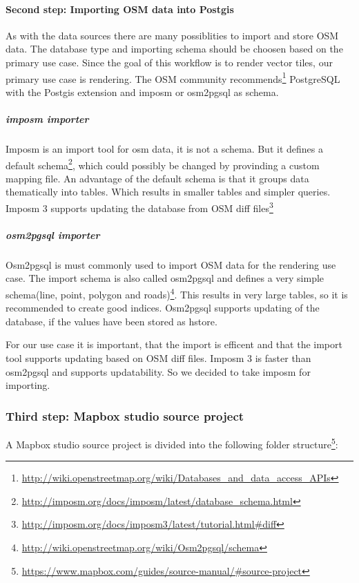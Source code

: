 \paragraph{Second step: Importing OSM data into
Postgis}\label{second-step-importing-osm-data-into-postgis}

As with the data sources there are many possiblities to import and store
OSM data. The database type and importing schema should be choosen based
on the primary use case. Since the goal of this workflow is to render
vector tiles, our primary use case is rendering. The OSM community
recommends\footnote{\url{http://wiki.openstreetmap.org/wiki/Databases_and_data_access_APIs}}
PostgreSQL with the Postgis extension and imposm or osm2pgsql as schema.

\subparagraph{imposm importer}\label{imposm-importer}

Imposm is an import tool for osm data, it is not a schema. But it
defines a default
schema\footnote{\url{http://imposm.org/docs/imposm/latest/database_schema.html}},
which could possibly be changed by provinding a custom mapping file. An
advantage of the default schema is that it groups data thematically into
tables. Which results in smaller tables and simpler queries. Imposm 3
supports updating the database from OSM diff
files\footnote{\url{http://imposm.org/docs/imposm3/latest/tutorial.html\#diff}}

\subparagraph{osm2pgsql importer}\label{osm2pgsql-importer}

Osm2pgsql is must commonly used to import OSM data for the rendering use
case. The import schema is also called osm2pgsql and defines a very
simple schema(line, point, polygon and
roads)\footnote{\url{http://wiki.openstreetmap.org/wiki/Osm2pgsql/schema}}.
This results in very large tables, so it is recommended to create good
indices. Osm2pgsql supports updating of the database, if the values have
been stored as hstore.

For our use case it is important, that the import is efficent and that
the import tool supports updating based on OSM diff files. Imposm 3 is
faster than osm2pgsql and supports updatability. So we decided to take
imposm for importing.

\subsubsection{Third step: Mapbox studio source
project}\label{third-step-mapbox-studio-source-project}

A Mapbox studio source project is divided into the following folder
structure\footnote{\url{https://www.mapbox.com/guides/source-manual/\#source-project}}:


